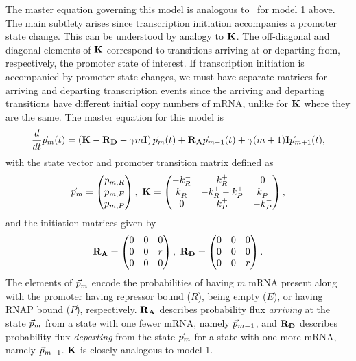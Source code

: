 The master equation governing this model is analogous
to~ for model 1 above. The
main subtlety arises since transcription initiation accompanies a promoter state
change. This can be understood by analogy to $\mathbf{K}$. The off-diagonal and
diagonal elements of $\mathbf{K}$ correspond to transitions arriving at or
departing from, respectively, the promoter state of interest. If transcription
initiation is accompanied by promoter state changes, we must have separate
matrices for arriving and departing transcription events since the arriving and
departing transitions have different initial copy numbers of mRNA, unlike for
$\mathbf{K}$ where they are the same. The master equation for this model is
\begin{equation}
\frac{d {}}{d t}\vec{p}_m(t) =
\left( \mathbf{K} - \mathbf{R_D} - \gamma m \mathbf{I} \right) \vec{p}_m(t)
                + \mathbf{R_A} \vec{p}_{m-1}(t) +
                \gamma (m+1) \mathbf{I} \vec{p}_{m+1}(t),
\label{eq:3state_rep_cme}
\end{equation}
with the state vector and promoter transition matrix defined as
\begin{equation}
\vec{p}_m = \begin{pmatrix} p_{m,R} \\ p_{m,E} \\ p_{m,P} \end{pmatrix},\
\mathbf{K} = \begin{pmatrix} -k_R^- & k_R^+ & 0 \\
                        k_R^- & -k_R^+ -k_P^+ & k_P^- \\
                        0 & k_P^+ & -k_P^- 
                \end{pmatrix},
\label{eq:3state_cme_matrices_pt1}
\end{equation}
and the initiation matrices given by
\begin{equation}
\mathbf{R_A} = \begin{pmatrix}
                0 & 0 & 0 \\ 
                0 & 0 & r \\ 
                0 & 0 & 0
                \end{pmatrix},\
\mathbf{R_D} = \begin{pmatrix}
                0 & 0 & 0 \\ 
                0 & 0 & 0 \\ 
                0 & 0 & r
                \end{pmatrix}.
\label{eq:3state_cme_matrices_pt2}
\end{equation}
The elements of $\vec{p}_m$ encode the probabilities of having $m$ mRNA present
along with the promoter having repressor bound ($R$), being empty ($E$), or
having RNAP bound ($P$), respectively. $\mathbf{R_A}$ describes probability flux
\textit{arriving} at the state $\vec{p}_m$ from a state with one fewer mRNA,
namely $\vec{p}_{m-1}$, and $\mathbf{R_D}$ describes probability flux
\textit{departing} from the state $\vec{p}_m$ for a state with one more mRNA,
namely $\vec{p}_{m+1}$. $\mathbf{K}$ is closely analogous to model 1.

